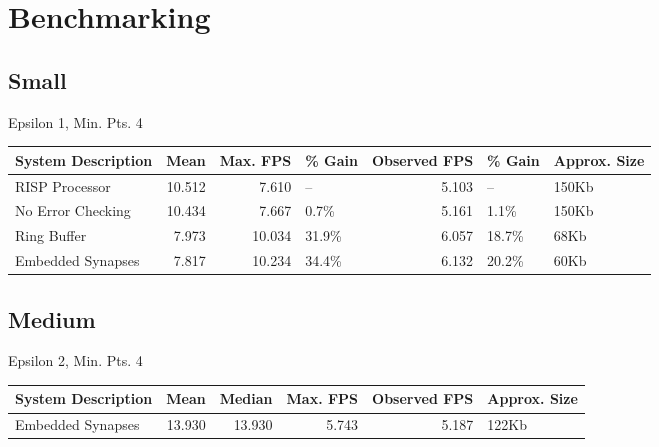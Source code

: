 \documentclass[conference]{IEEEtran}{article}
\begin{document}
\section{Benchmarking}
\label{sec:orge505e93}
\subsection{Small}
\label{sec:orgdf9b04b}
Epsilon 1, Min. Pts. 4\\
\begin{center}
\begin{tabular}{l|r|r|l|r|ll}
System Description & Mean & Max. FPS & \% Gain & Observed FPS & \% Gain & Approx. Size\\
\hline
RISP Processor & 10.512 & 7.610 & -- & 5.103 & -- & 150Kb\\
No Error Checking & 10.434 & 7.667 & 0.7\% & 5.161 & 1.1\% & 150Kb\\
Ring Buffer & 7.973 & 10.034 & 31.9\% & 6.057 & 18.7\% & 68Kb\\
Embedded Synapses & 7.817 & 10.234 & 34.4\% & 6.132 & 20.2\% & 60Kb\\
\end{tabular}
\end{center}
\subsection{Medium}
\label{sec:org03352ff}
Epsilon 2, Min. Pts. 4\\
\begin{center}
\begin{tabular}{l|r|r|rrl}
System Description & Mean & Median & Max. FPS & Observed FPS & Approx. Size\\
\hline
Embedded Synapses & 13.930 & 13.930 & 5.743 & 5.187 & 122Kb\\
\end{tabular}
\end{center}
\end{document}
